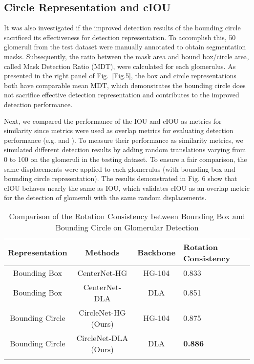 \documentclass[journal]{IEEEtran}
\newcommand{\Fig}{Fig.}
\begin{document}
\subsection{Circle Representation and cIOU}
It was also investigated if the improved detection results of the bounding circle sacrificed its effectiveness for detection representation. To accomplish this, 50 glomeruli from the test dataset were manually annotated to obtain segmentation masks. Subsequently, the ratio between the mask area and bound box/circle area, called Mask Detection Ratio (MDT), were calculated for each glomerulus. As presented in the right panel of \Fig~\ref{Fig.5}, the box and circle representations both have comparable mean MDT, which demonstrates the bounding circle does not sacrifice effective detection representation and contributes to the improved detection performance.

Next, we compared the performance of the IOU and cIOU as metrics for similarity since metrics were used as overlap metrics for evaluating detection performance (e.g.  and ). To measure their performance as similarity metrics, we simulated different detection results by adding random translations varying from 0 to 100 on the glomeruli in the testing dataset. To ensure a fair comparison, the same displacements were applied to each glomerulus (with bounding box and bounding circle representation). The results demonstrated in Fig. 6 show that cIOU behaves nearly the same as IOU, which validates cIOU as an overlap metric for the detection of glomeruli with the same random displacements. 

\begin{table}
\caption{Comparison of the Rotation Consistency between Bounding Box and Bounding Circle on Glomerular Detection}
\centering
\begin{tabular}{cccm{}<{\centering}}
\hline
Representation & Methods & Backbone & Rotation Consistency \\
\hline
Bounding Box & CenterNet-HG\cite{zhou2019objects} &  HG-104 & 0.833 \\
Bounding Box & CenterNet-DLA\cite{zhou2019objects} & DLA & 0.851 \\
\hline
Bounding Circle  & CircleNet-HG (Ours) & HG-104  & 0.875 \\ 
Bounding Circle  & CircleNet-DLA (Ours) & DLA & \textbf{0.886}  \\ 
\hline
\label{table2}
\end{tabular}
\end{table}
\end{document}

